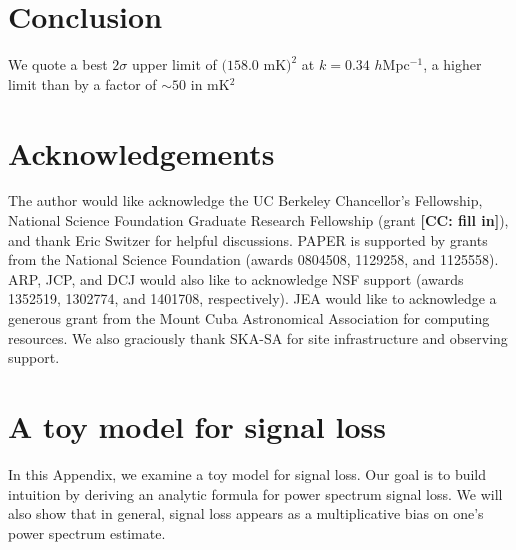 \documentclass[preprint2,numberedappendix,tighten]{aastex6}  %
\newcommand{\cc}[1]{{\color{purple} \textbf{[CC: #1]}}}
\begin{document}
\section{Conclusion}
\label{sec:Con}

We quote a best $2\sigma$ upper limit of $(158.0$ mK$)^{2}$ at $k=0.34$ $h$Mpc$^{-1}$, a higher limit than \citet{ali_et_al2015} by a factor of $\sim50$ in mK$^{2}$

\section{Acknowledgements}
The author would like acknowledge the UC Berkeley Chancellor's Fellowship, National Science Foundation Graduate Research Fellowship (grant \cc{fill in}), and thank Eric Switzer for helpful discussions. PAPER is supported by grants from the National Science Foundation (awards 0804508, 1129258, and 1125558). ARP, JCP, and DCJ would also like to acknowledge NSF support (awards 1352519, 1302774, and 1401708, respectively). JEA would like to acknowledge a generous grant from the Mount Cuba Astronomical Association for computing resources. We also graciously thank SKA-SA for site infrastructure and observing support.
\label{sec:Ack}

\appendix
\section{A toy model for signal loss}
\label{sec:sigloss_appendix}

In this Appendix, we examine a toy model for signal loss. Our goal is to build intuition by deriving an analytic formula for power spectrum signal loss. We will also show that in general, signal loss appears as a multiplicative bias on one's power spectrum estimate.
\end{document}
